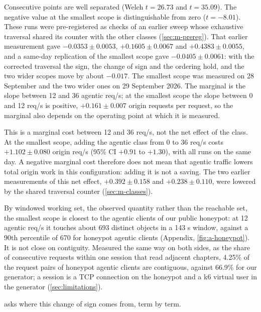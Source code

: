 Consecutive points are well separated (Welch $t = 26.73$ and $t = 35.09$).
The negative value at the smallest scope is distinguishable from zero
($t = -8.01$).
These runs were pre-registered as checks of an earlier sweep whose exhaustive traversal
shared its counter with the other classes (\cref{sec:m-prereg}).
That earlier measurement gave $-0.0353 \pm 0.0053$, $+0.1605 \pm 0.0067$ and
$+0.4383 \pm 0.0055$, and a same-day replication of the smallest scope gave
$-0.0405 \pm 0.0061$: with the corrected traversal the sign, the change of sign and the
ordering hold, and the two wider scopes move by about $-0.017$.
The smallest scope was measured on 28 September and the two wider ones on 29 September
2026.
The marginal is the slope between 12 and 36 agentic req/s; at the smallest scope the slope
between 0 and 12 req/s is positive, $+0.161 \pm 0.007$ origin requests per request, so the
marginal also depends on the operating point at which it is measured.

This is a marginal cost between 12 and 36 req/s, not the net effect of the class.
At the smallest scope, adding the agentic class from 0 to 36 req/s costs
$+1.102 \pm 0.080$ origin req/s (95\% CI $+0.91$ to $+1.30$), with all runs on the same
day.
A negative marginal cost therefore does not mean that agentic traffic lowers total origin
work in this configuration: adding it is not a saving.
The two earlier measurements of this net effect, $+0.392 \pm 0.158$ and
$+0.238 \pm 0.110$, were lowered by the shared traversal counter
(\cref{sec:m-classes}).

By windowed working set, the observed quantity rather than the reachable set, the smallest
scope is closest to the agentic clients of our public honeypot: at 12 agentic req/s it
touches about 693 distinct objects in a 143 s window, against a 90th percentile of 670 for honeypot agentic clients
(Appendix, \cref{fig:a-honeypot}).
It is not close on contiguity.
Measured the same way on both sides, as the share of consecutive requests within one
session that read adjacent chapters, 4.25\% of the request pairs of honeypot agentic
clients are contiguous, against 66.9\% for our generator; a session is a TCP connection
on the honeypot and a k6 virtual user in the generator
(\cref{sec:limitations}).

 asks where this change of sign comes from, term by term.

